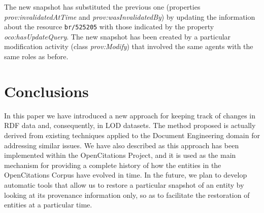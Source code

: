 \documentclass[runningheads,a4paper]{llncs}
\begin{document}
The new snapshot has substituted the previous one (properties {\em prov:invalidatedAtTime} and {\em prov:wasInvalidatedBy}) by updating the information about the resource \Verb+br/525205+ with those indicated by the property {\em oco:hasUpdateQuery}. The new snapshot has been created by a particular modification activity (class {\em prov:Modify}) that involved the same agents with the same roles as before.

\section{Conclusions}\label{__RefHeading__16816_1591320820}

In this paper we have introduced a new approach for keeping track of changes in RDF data and, consequently, in LOD datasets. The method proposed is actually derived from existing techniques applied to the Document Engineering domain for addressing similar issues. We have also described as this approach has been implemented within the OpenCitations Project, and it is used as the main mechanism for providing a complete history of how the entities in the OpenCitations Corpus have evolved in time. In the future, we plan to develop automatic tools that allow us to restore a particular snapshot of an entity by looking at its provenance information only, so as to facilitate the restoration of entities at a particular time.
\end{document}
